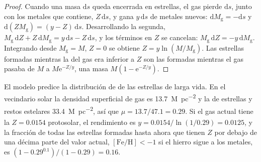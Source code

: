 \begin{proof}
Cuando una masa $\mathrm{d}s$ queda encerrada en estrellas, el gas pierde
$\mathrm{d}s$, junto con los metales que contiene, $Z\,\mathrm{d}s$,
y gana $y\,\mathrm{d}s$ de metales nuevos:
$\mathrm{d}M_\mathrm{g} = -\mathrm{d}s$ y
$\mathrm{d}(Z M_\mathrm{g}) = (y - Z)\,\mathrm{d}s$. Desarrollando la
segunda, $M_\mathrm{g}\,\mathrm{d}Z + Z\,\mathrm{d}M_\mathrm{g} =
y\,\mathrm{d}s - Z\,\mathrm{d}s$, y los términos en $Z$ se cancelan:
$M_\mathrm{g}\,\mathrm{d}Z = -y\,\mathrm{d}M_\mathrm{g}$. Integrando desde
$M_\mathrm{g} = M$, $Z = 0$ se obtiene $Z = y\ln(M/M_\mathrm{g})$. Las
estrellas formadas mientras la  del gas era inferior a $Z$ son las formadas
mientras el gas pasaba de $M$ a $M\mathrm{e}^{-Z/y}$, una masa
$M(1 - \mathrm{e}^{-Z/y})$.
\end{proof}

El modelo predice la distribución de  de las estrellas de larga vida.
En el vecindario solar la densidad superficial de gas es
\qty{13.7}{M_\odot.pc^{-2}} y la de estrellas y restos estelares
\qty{33.4}{M_\odot.pc^{-2}}, así que $\mu = 13.7/47.1 = 0.29$. Si el gas actual
tiene la $Z = 0.0154$ protosolar, el rendimiento es
$y = 0.0154/\ln(1/0.29) = 0.0125$, y la fracción de todas las estrellas formadas
hasta ahora que tienen $Z$ por debajo de una décima parte del valor actual,
$[\mathrm{Fe/H}] < -1$ si el hierro sigue a los metales, es
$(1 - 0.29^{0.1})/(1 - 0.29) = 0.16$.

